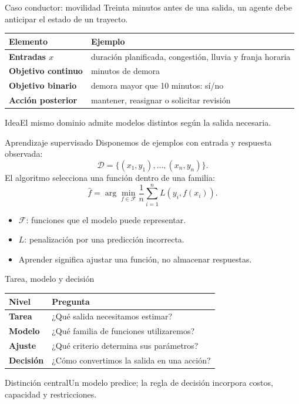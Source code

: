 \documentclass[aspectratio=169,10pt]{beamer}
\begin{document}
\begin{frame}{Caso conductor: movilidad}
  \small
  Treinta minutos antes de una salida, un agente debe anticipar el estado de un trayecto.
  \begin{tabularx}{\textwidth}{>{\bfseries}p{}X}\toprule
  Elemento & Ejemplo\\\midrule
  Entradas $x$ & duración planificada, congestión, lluvia y franja horaria\\
  Objetivo continuo & minutos de demora\\
  Objetivo binario & demora mayor que 10 minutos: sí/no\\
  Acción posterior & mantener, reasignar o solicitar revisión\\\bottomrule
  \end{tabularx}
  \begin{block}{Idea}El mismo dominio admite modelos distintos según la salida necesaria.\end{block}
\end{frame}

\begin{frame}{Aprendizaje supervisado}
  \small
  Disponemos de ejemplos con entrada y respuesta observada:
  \[\mathcal D=\{(x_1,y_1),\ldots,(x_n,y_n)\}.\]
  El algoritmo selecciona una función dentro de una familia:
  \[\widehat f=\arg\min_{f\in\mathcal F}\frac{1}{n}\sum_{i=1}^{n}L(y_i,f(x_i)).\]
  \begin{itemize}
    \item $\mathcal F$: funciones que el modelo puede representar.
    \item $L$: penalización por una predicción incorrecta.
    \item Aprender significa ajustar una función, no almacenar respuestas.
  \end{itemize}
\end{frame}

\begin{frame}{Tarea, modelo y decisión}
  \small
  \begin{tabularx}{\textwidth}{>{\bfseries}p{}X}\toprule
  Nivel & Pregunta\\\midrule
  Tarea & ¿Qué salida necesitamos estimar?\\
  Modelo & ¿Qué familia de funciones utilizaremos?\\
  Ajuste & ¿Qué criterio determina sus parámetros?\\
  Decisión & ¿Cómo convertimos la salida en una acción?\\\bottomrule
  \end{tabularx}
  \begin{alertblock}{Distinción central}Un modelo predice; la regla de decisión incorpora costos, capacidad y restricciones.\end{alertblock}
\end{frame}
\end{document}
